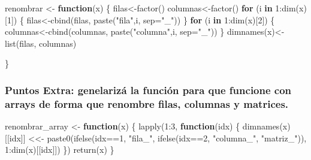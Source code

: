 \documentclass[
]{article}
\newenvironment{Shaded}{\begin{snugshade}}{\end{snugshade}}
\newcommand{\AttributeTok}[1]{\textcolor[rgb]{0.77,0.63,0.00}{#1}}
\newcommand{\ControlFlowTok}[1]{\textcolor[rgb]{0.13,0.29,0.53}{\textbf{#1}}}
\newcommand{\DecValTok}[1]{\textcolor[rgb]{0.00,0.00,0.81}{#1}}
\newcommand{\FunctionTok}[1]{\textcolor[rgb]{0.00,0.00,0.00}{#1}}
\newcommand{\NormalTok}[1]{#1}
\newcommand{\OtherTok}[1]{\textcolor[rgb]{0.56,0.35,0.01}{#1}}
\newcommand{\SpecialCharTok}[1]{\textcolor[rgb]{0.00,0.00,0.00}{#1}}
\newcommand{\StringTok}[1]{\textcolor[rgb]{0.31,0.60,0.02}{#1}}
\begin{document}
\begin{Shaded}
\begin{Highlighting}[]
\NormalTok{renombrar }\OtherTok{\textless{}{-}} \ControlFlowTok{function}\NormalTok{(x) \{}
\NormalTok{   filas}\OtherTok{\textless{}{-}}\FunctionTok{factor}\NormalTok{()}
\NormalTok{  columnas}\OtherTok{\textless{}{-}}\FunctionTok{factor}\NormalTok{()}
  \ControlFlowTok{for}\NormalTok{ (i }\ControlFlowTok{in} \DecValTok{1}\SpecialCharTok{:}\FunctionTok{dim}\NormalTok{(x)[}\DecValTok{1}\NormalTok{]) \{}
\NormalTok{    filas}\OtherTok{\textless{}{-}}\FunctionTok{cbind}\NormalTok{(filas, }\FunctionTok{paste}\NormalTok{(}\StringTok{"fila"}\NormalTok{,i, }\AttributeTok{sep=}\StringTok{"\_"}\NormalTok{))}
\NormalTok{  \}}
  \ControlFlowTok{for}\NormalTok{ (i }\ControlFlowTok{in} \DecValTok{1}\SpecialCharTok{:}\FunctionTok{dim}\NormalTok{(x)[}\DecValTok{2}\NormalTok{]) \{}
\NormalTok{    columnas}\OtherTok{\textless{}{-}}\FunctionTok{cbind}\NormalTok{(columnas, }\FunctionTok{paste}\NormalTok{(}\StringTok{"columna"}\NormalTok{,i, }\AttributeTok{sep=}\StringTok{"\_"}\NormalTok{))}
\NormalTok{  \}}
    \FunctionTok{dimnames}\NormalTok{(x)}\OtherTok{\textless{}{-}}\FunctionTok{list}\NormalTok{(filas, columnas)}

\NormalTok{\}}
\end{Highlighting}
\end{Shaded}

\hypertarget{puntos-extra-genelarizuxe1-la-funciuxf3n-para-que-funcione-con-arrays-de-forma-que-renombre-filas-columnas-y-matrices.}{%
\subsubsection{Puntos Extra: genelarizá la función para que funcione con
arrays de forma que renombre filas, columnas y
matrices.}\label{puntos-extra-genelarizuxe1-la-funciuxf3n-para-que-funcione-con-arrays-de-forma-que-renombre-filas-columnas-y-matrices.}}

\begin{Shaded}
\begin{Highlighting}[]
\NormalTok{renombrar\_array }\OtherTok{\textless{}{-}} \ControlFlowTok{function}\NormalTok{(x) \{}
  \FunctionTok{lapply}\NormalTok{(}\DecValTok{1}\SpecialCharTok{:}\DecValTok{3}\NormalTok{, }\ControlFlowTok{function}\NormalTok{(idx) \{}
\FunctionTok{dimnames}\NormalTok{(x)[[idx]] }\OtherTok{\textless{}\textless{}{-}} \FunctionTok{paste0}\NormalTok{(}\FunctionTok{ifelse}\NormalTok{(idx}\SpecialCharTok{==}\DecValTok{1}\NormalTok{, }\StringTok{"fila\_"}\NormalTok{, }\FunctionTok{ifelse}\NormalTok{(idx}\SpecialCharTok{==}\DecValTok{2}\NormalTok{, }\StringTok{"columna\_"}\NormalTok{, }\StringTok{"matriz\_"}\NormalTok{)), }\DecValTok{1}\SpecialCharTok{:}\FunctionTok{dim}\NormalTok{(x)[[idx]])}
\NormalTok{\})}
\FunctionTok{return}\NormalTok{(x)}
\NormalTok{\}}
\end{Highlighting}
\end{Shaded}
\end{document}
